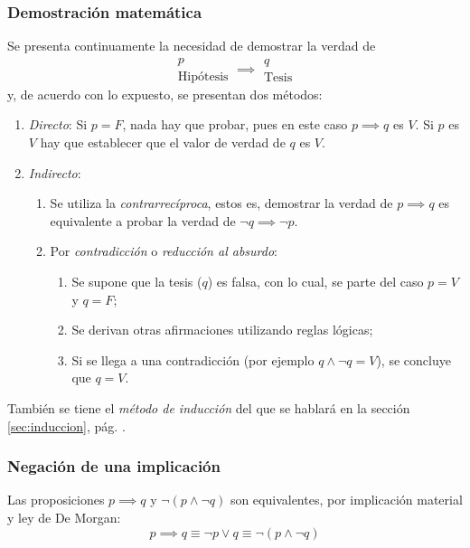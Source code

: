 \subsubsection{Demostración matemática}
Se presenta continuamente la necesidad de demostrar la verdad de
\[ \begin{array}{c}
	p\\
	\mbox{Hipótesis}
\end{array} \implies \begin{array}{c}
q\\
\mbox{Tesis}
\end{array} \]
y, de acuerdo con lo expuesto, se presentan dos métodos:

\begin{enumerate}[label=\roman*)]
	\item \textit{Directo}: Si $p = F$, nada hay que probar, pues en este caso $p \implies q$ es $V$. Si $p$ es $V$ hay que establecer que el valor de verdad de $q$ es $V$.
	\item \textit{Indirecto}:
	\begin{enumerate}[label=\alph*)]
		\item Se utiliza la \textit{contrarrecíproca}, estos es, demostrar la verdad de $p \implies q$ es equivalente a probar la verdad de $\neg q \implies \neg p$.
		\item Por \textit{contradicción} o \textit{reducción al absurdo}:
		\begin{enumerate}
			\item Se supone que la tesis ($q$) es falsa, con lo cual, se parte del caso $p = V$ y $q = F$;
			\item Se derivan otras afirmaciones utilizando reglas lógicas;
			\item Si se llega a una contradicción (por ejemplo $q \land \neg q = V$), se concluye que $q = V$.
		\end{enumerate}
	\end{enumerate}
\end{enumerate}

\begin{lgnote}
También se tiene el \textit{método de inducción} del que se hablará en la sección \ref{sec:induccion}, pág. \pageref{sec:induccion}.
\end{lgnote}

\subsubsection{Negación de una implicación} 
Las proposiciones $p \implies q$ y $\neg (p \land \neg q)$ son equivalentes, por implicación material y ley de De Morgan:
\[ p \implies q \equiv \neg p \lor q \equiv \neg \left( p \land \neg q \right) \]

